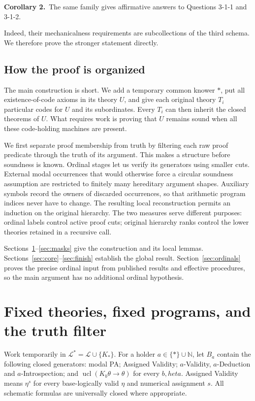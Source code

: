 \documentclass[11pt]{article}
\newcommand{\N}{\mathbb N}
\newcommand{\ucl}{\operatorname{ucl}}
\newcommand{\statement}[2]{\par\textbf{#1.}\ #2\par}
\begin{document}
\statement{Corollary 2}{The same family gives affirmative answers to
Questions 3-1-1 and 3-1-2.}

Indeed, their mechanicalness requirements are subcollections of the
third schema. We therefore prove the stronger statement directly.

\subsection*{How the proof is organized}

The main construction is short. We add a temporary common knower $*$,
put all existence-of-code axioms in its theory $U$, and give each
original theory $T_i$ particular codes for $U$ and its subordinates.
Every $T_i$ can then inherit the closed theorems of $U$. What requires
work is proving that $U$ remains sound when all these code-holding
machines are present.

We first separate proof membership from truth by filtering each raw
proof predicate through the truth of its argument. This makes a
structure before soundness is known. Ordinal stages let us verify its
generators using smaller cuts. External modal occurrences that would
otherwise force a circular soundness assumption are restricted to
finitely many hereditary argument shapes. Auxiliary symbols record the
owners of discarded occurrences, so that arithmetic program indices
never have to change. The resulting local reconstruction permits an
induction on the original hierarchy. The two measures serve different
purposes: ordinal labels control active proof cuts; original hierarchy
ranks control the lower theories retained in a recursive call.

Sections~\ref{sec:fixed}--\ref{sec:masks} give the construction and its
local lemmas. Sections~\ref{sec:core}--\ref{sec:finish} establish the
global result. Section~\ref{sec:ordinals} proves the precise ordinal
input from published results and effective procedures, so the main
argument has no additional ordinal hypothesis.

\section{Fixed theories, fixed programs, and the truth filter}\label{sec:fixed}

Work temporarily in $\mathcal L^*=\mathcal L\cup\{K_*\}$. For a holder
$a\in\{*\}\cup\N$, let $B_a$ contain the following closed generators:
modal PA; Assigned Validity; $a$-Validity, $a$-Deduction and
$a$-Introspection; and $\ucl(K_b\theta\to\theta)$ for every $b,	heta$.
Assigned Validity means $\eta^s$ for every base-logically valid $\eta$
and numerical assignment $s$. All schematic formulas are universally
closed where appropriate.
\end{document}

